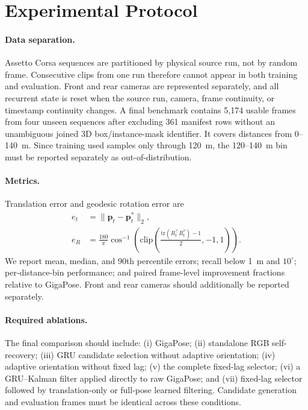 \documentclass[10pt,twocolumn]{article}
\begin{document}
\section{Experimental Protocol}
\label{sec:protocol}

\paragraph{Data separation.}
Assetto Corsa sequences are partitioned by physical source run, not by random
frame. Consecutive clips from one run therefore cannot appear in both training
and evaluation. Front and rear cameras are represented separately, and all
recurrent state is reset when the source run, camera, frame continuity, or
timestamp continuity changes. A final benchmark contains 5,174 usable frames
from four unseen sequences after excluding 361 manifest rows without an
unambiguous joined 3D box/instance-mask identifier. It covers distances from
0--140~m. Since training used samples only through 120~m, the 120--140~m bin
must be reported separately as out-of-distribution.

\paragraph{Metrics.}
Translation error and geodesic rotation error are
\begin{align}
e_t &= \|\bm{p}_t-\bm{p}_t^*\|_2,\\
e_R &= \frac{180}{\pi}
\cos^{-1}\!\left(\mathrm{clip}\left(
\frac{\mathrm{tr}(R_t^{\top}R_t^*)-1}{2},-1,1\right)\right).
\end{align}
We report mean, median, and 90th percentile errors; recall below 1~m and
$10^\circ$; per-distance-bin performance; and paired frame-level improvement
fractions relative to GigaPose. Front and rear cameras should additionally be
reported separately.

\paragraph{Required ablations.}
The final comparison should include: (i) GigaPose; (ii) standalone RGB
self-recovery; (iii) GRU candidate selection without adaptive orientation;
(iv) adaptive orientation without fixed lag; (v) the complete fixed-lag
selector; (vi) a GRU--Kalman filter applied directly to raw GigaPose; and
(vii) fixed-lag selector followed by translation-only or full-pose learned
filtering. Candidate generation and evaluation frames must be identical across
these conditions.
\end{document}
